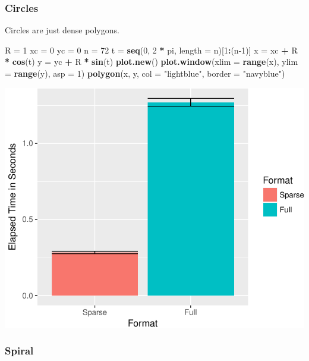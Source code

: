 \documentclass[]{book}
\newenvironment{Shaded}{\begin{snugshade}}{\end{snugshade}}
\newcommand{\DataTypeTok}[1]{\textcolor[rgb]{0.13,0.29,0.53}{#1}}
\newcommand{\DecValTok}[1]{\textcolor[rgb]{0.00,0.00,0.81}{#1}}
\newcommand{\KeywordTok}[1]{\textcolor[rgb]{0.13,0.29,0.53}{\textbf{#1}}}
\newcommand{\NormalTok}[1]{#1}
\newcommand{\OperatorTok}[1]{\textcolor[rgb]{0.81,0.36,0.00}{\textbf{#1}}}
\newcommand{\StringTok}[1]{\textcolor[rgb]{0.31,0.60,0.02}{#1}}
\theoremstyle{definition}
\theoremstyle{definition}
\theoremstyle{definition}
\theoremstyle{remark}
\begin{document}
\hypertarget{circles}{%
\subsubsection{Circles}\label{circles}}

Circles are just dense polygons.

\begin{Shaded}
\begin{Highlighting}[]
\NormalTok{R =}\StringTok{ }\DecValTok{1}
\NormalTok{xc =}\StringTok{ }\DecValTok{0}
\NormalTok{yc =}\StringTok{ }\DecValTok{0}
\NormalTok{n =}\StringTok{ }\DecValTok{72}
\NormalTok{t =}\StringTok{ }\KeywordTok{seq}\NormalTok{(}\DecValTok{0}\NormalTok{, }\DecValTok{2} \OperatorTok{*}\StringTok{ }\NormalTok{pi, }\DataTypeTok{length =}\NormalTok{ n)[}\DecValTok{1}\OperatorTok{:}\NormalTok{(n}\DecValTok{-1}\NormalTok{)]}
\NormalTok{x =}\StringTok{ }\NormalTok{xc }\OperatorTok{+}\StringTok{ }\NormalTok{R }\OperatorTok{*}\StringTok{ }\KeywordTok{cos}\NormalTok{(t)}
\NormalTok{y =}\StringTok{ }\NormalTok{yc }\OperatorTok{+}\StringTok{ }\NormalTok{R }\OperatorTok{*}\StringTok{ }\KeywordTok{sin}\NormalTok{(t)}
\KeywordTok{plot.new}\NormalTok{()}
\KeywordTok{plot.window}\NormalTok{(}\DataTypeTok{xlim =} \KeywordTok{range}\NormalTok{(x), }\DataTypeTok{ylim =} \KeywordTok{range}\NormalTok{(y), }\DataTypeTok{asp =} \DecValTok{1}\NormalTok{)}
\KeywordTok{polygon}\NormalTok{(x, y, }\DataTypeTok{col =} \StringTok{"lightblue"}\NormalTok{, }\DataTypeTok{border =} \StringTok{"navyblue"}\NormalTok{)}
\end{Highlighting}
\end{Shaded}

\includegraphics[width=0.5\linewidth]{Rcourse_files/figure-latex/unnamed-chunk-283-1}

\hypertarget{spiral}{%
\subsubsection{Spiral}\label{spiral}}
\end{document}
